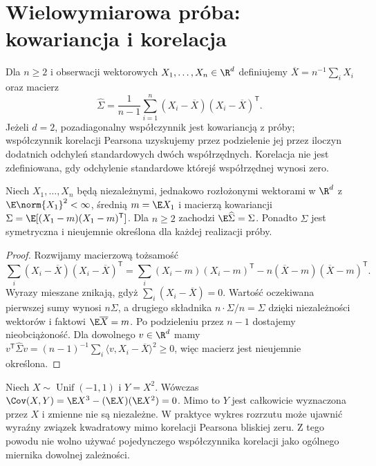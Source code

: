 \section{Wielowymiarowa próba: kowariancja i korelacja}\label{sec:sample-covariance}
\begin{definicja}\label{def:samplecov}
Dla $n\ge2$ i obserwacji wektorowych $X_1,\ldots,X_n\in\R^d$ definiujemy $\overline X=n^{-1}\sum_iX_i$ oraz macierz
\[
\widehat\Sigma=\frac1{n-1}\sum_{i=1}^n(X_i-\overline X)(X_i-\overline X)^{\mathsf T}.
\]
Jeżeli $d=2$, pozadiagonalny współczynnik jest kowariancją z próby; współczynnik korelacji Pearsona uzyskujemy przez podzielenie jej przez iloczyn dodatnich odchyleń standardowych dwóch współrzędnych. Korelacja nie jest zdefiniowana, gdy odchylenie standardowe którejś współrzędnej wynosi zero.
\end{definicja}

\begin{twierdzenie}\label{thm:samplecov-unbiased}
Niech $X_1,\ldots,X_n$ będą niezależnymi, jednakowo rozłożonymi wektorami w $\R^d$ z $\E\norm{X_1}^2<\infty$, średnią $m=\E X_1$ i macierzą kowariancji $\Sigma=\E[(X_1-m)(X_1-m)^{\mathsf T}]$. Dla $n\ge2$ zachodzi $\E\widehat\Sigma=\Sigma$. Ponadto $\widehat\Sigma$ jest symetryczna i nieujemnie określona dla każdej realizacji próby.
\end{twierdzenie}
\begin{proof}
Rozwijamy macierzową tożsamość
\[
\sum_i(X_i-\overline X)(X_i-\overline X)^{\mathsf T}
=\sum_i(X_i-m)(X_i-m)^{\mathsf T}
-n(\overline X-m)(\overline X-m)^{\mathsf T}.
\]
Wyrazy mieszane znikają, gdyż $\sum_i(X_i-\overline X)=0$. Wartość oczekiwana pierwszej sumy wynosi $n\Sigma$, a drugiego składnika $n\cdot\Sigma/n=\Sigma$ dzięki niezależności wektorów i faktowi $\E\overline X=m$. Po podzieleniu przez $n-1$ dostajemy nieobciążoność. Dla dowolnego $v\in\R^d$ mamy $v^{\mathsf T}\widehat\Sigma v=(n-1)^{-1}\sum_i\langle v,X_i-\overline X\rangle^2\ge0$, więc macierz jest nieujemnie określona.
\end{proof}

\begin{przyklad}
Niech $X\sim\operatorname{Unif}(-1,1)$ i $Y=X^2$. Wówczas $\Cov(X,Y)=\E X^3-(\E X)(\E X^2)=0$. Mimo to $Y$ jest całkowicie wyznaczona przez $X$ i zmienne nie są niezależne. W praktyce wykres rozrzutu może ujawnić wyraźny związek kwadratowy mimo korelacji Pearsona bliskiej zeru. Z tego powodu nie wolno używać pojedynczego współczynnika korelacji jako ogólnego miernika dowolnej zależności.
\end{przyklad}

